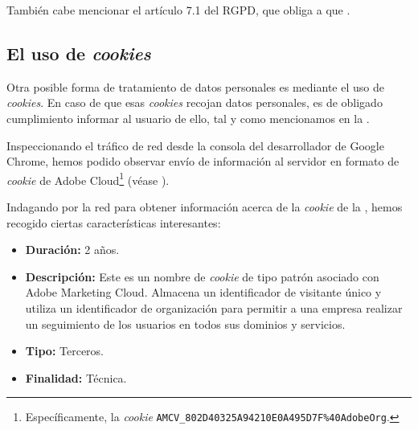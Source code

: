 
También cabe mencionar el artículo 7.1 del RGPD, que obliga a que .


\subsection{El uso de \textit{cookies}}\label{subsec:cookies}
Otra posible forma de tratamiento de datos personales es mediante el uso de \textit{cookies}. En caso de que esas \textit{cookies} recojan datos personales, es de obligado cumplimiento informar al usuario de ello, tal y como mencionamos en la .

Inspeccionando el tráfico de red desde la consola del desarrollador de Google Chrome, hemos podido observar envío de información al servidor en formato de \textit{cookie} de Adobe Cloud\footnote{Específicamente, la \textit{cookie} \texttt{AMCV\_802D40325A94210E0A495D7F\%40AdobeOrg}.} (véase ).


Indagando por la red para obtener información acerca de la \textit{cookie} de la , hemos recogido ciertas características interesantes:
\begin{itemize}
    \item \textbf{Duración:} 2 años.
    \item \textbf{Descripción:} Este es un nombre de \textit{cookie} de tipo patrón asociado con Adobe Marketing Cloud. Almacena un identificador de visitante único y utiliza un identificador de organización para permitir a una empresa realizar un seguimiento de los usuarios en todos sus dominios y servicios.
    \item \textbf{Tipo:} Terceros.
    \item \textbf{Finalidad:} Técnica.
\end{itemize}

